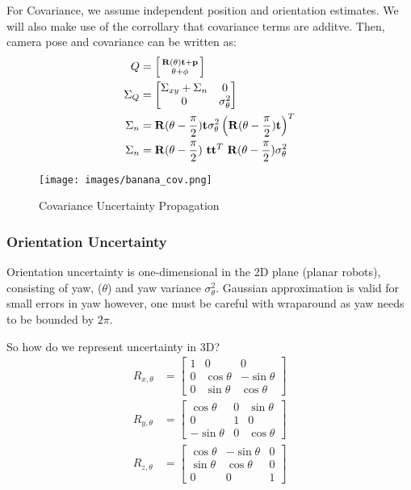 For Covariance, we assume independent position and orientation estimates. We will also make use of the corrollary that covariance terms are additve. Then, camera pose and covariance can be written as:
\begin{align*}
  Q &= \begin{bsmallmatrix} \mathbf{R}(\theta)\mathbf{t} + \mathbf{p} \\ \theta + \phi \end{bsmallmatrix} \\
  \Sigma_Q &= \begin{bmatrix} \Sigma_{xy} + \Sigma_{n} & 0 \\ 0 & \sigma_{\theta}^2 \end{bmatrix} \\
  \Sigma_n &= \mathbf{R}(\theta - \frac{\pi}{2})\mathbf{t}\sigma_{\theta}^2 \left( \mathbf{R}(\theta - \frac{\pi}{2})\mathbf{t}\right)^T\\
  \Sigma_n &= \mathbf{R}(\theta - \frac{\pi}{2}) \ \mathbf{t} \mathbf{t}^T \ \mathbf{R}(\theta - \frac{\pi}{2})\sigma_{\theta}^2\\
\end{align*}
\begin{figure}[H]
  \begin{center}
    \texttt{[image: images/banana\_cov.png]}
  \end{center}
  \caption{Covariance Uncertainty Propagation}\label{fig:}
\end{figure}

\subsubsection{Orientation Uncertainty}
Orientation uncertainty is one-dimensional in the 2D plane (planar robots), consisting of yaw, ($\theta$) and yaw variance $\sigma_{\theta}^2$.
Gaussian approximation is valid for small errors in yaw however, one must be careful with wraparound as yaw needs to be bounded by $2\pi$.

So how do we represent uncertainty in 3D?
\begin{align*}
R_{x,\theta} &= \begin{bmatrix}
1 & 0 & 0 \\
0 & \cos\theta & -\sin\theta \\
0 & \sin\theta & \cos\theta
\end{bmatrix} \\[1em]
R_{y,\theta} &= \begin{bmatrix}
\cos\theta & 0 & \sin\theta \\
0 & 1 & 0 \\
-\sin\theta & 0 & \cos\theta
\end{bmatrix} \\[1em]
R_{z,\theta} &= \begin{bmatrix}
\cos\theta & -\sin\theta & 0 \\
\sin\theta & \cos\theta & 0 \\
0 & 0 & 1
\end{bmatrix}
\end{align*}

